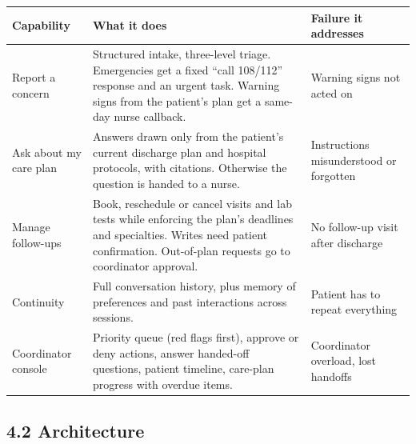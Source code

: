 \documentclass[11pt,a4paper]{article}
\begin{document}
\begin{center}
\small
\begin{tabularx}{\textwidth}{>{\raggedright\arraybackslash}p{3.4cm} L >{\raggedright\arraybackslash}p{3.3cm}}
\toprule
\textbf{Capability} & \textbf{What it does} & \textbf{Failure it addresses} \\
\midrule
Report a concern & Structured intake, three-level triage. Emergencies get a fixed ``call 108/112'' response and an urgent task. Warning signs from the patient's plan get a same-day nurse callback. & Warning signs not acted on \\
Ask about my care plan & Answers drawn only from the patient's current discharge plan and hospital protocols, with citations. Otherwise the question is handed to a nurse. & Instructions misunderstood or forgotten \\
Manage follow-ups & Book, reschedule or cancel visits and lab tests while enforcing the plan's deadlines and specialties. Writes need patient confirmation. Out-of-plan requests go to coordinator approval. & No follow-up visit after discharge \\
Continuity & Full conversation history, plus memory of preferences and past interactions across sessions. & Patient has to repeat everything \\
Coordinator console & Priority queue (red flags first), approve or deny actions, answer handed-off questions, patient timeline, care-plan progress with overdue items. & Coordinator overload, lost handoffs \\
\bottomrule
\end{tabularx}
\end{center}

\subsection*{4.2 Architecture}
\end{document}
